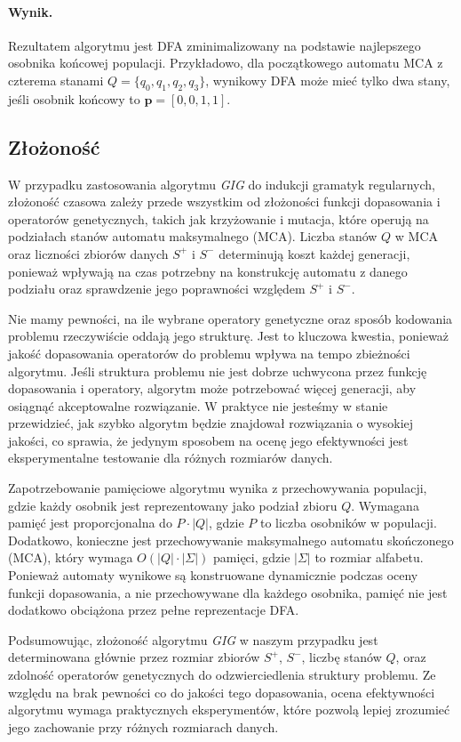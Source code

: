 \paragraph*{Wynik.}  
Rezultatem algorytmu jest DFA zminimalizowany na podstawie najlepszego osobnika końcowej populacji. Przykładowo, dla początkowego automatu MCA z czterema stanami \( Q = \{q_0, q_1, q_2, q_3\} \), wynikowy DFA może mieć tylko dwa stany, jeśli osobnik końcowy to \( \mathbf{p} = [0, 0, 1, 1] \).

\subsection{Złożoność}

W przypadku zastosowania algorytmu \textit{GIG} do indukcji gramatyk regularnych, złożoność czasowa zależy przede wszystkim od złożoności funkcji dopasowania i operatorów genetycznych, takich jak krzyżowanie i mutacja, które operują na podziałach stanów automatu maksymalnego (MCA). Liczba stanów \( Q \) w MCA oraz liczności zbiorów danych \( S^+ \) i \( S^- \) determinują koszt każdej generacji, ponieważ wpływają na czas potrzebny na konstrukcję automatu z danego podziału oraz sprawdzenie jego poprawności względem \( S^+ \) i \( S^- \).

Nie mamy pewności, na ile wybrane operatory genetyczne oraz sposób kodowania problemu rzeczywiście oddają jego strukturę. Jest to kluczowa kwestia, ponieważ jakość dopasowania operatorów do problemu wpływa na tempo zbieżności algorytmu. Jeśli struktura problemu nie jest dobrze uchwycona przez funkcję dopasowania i operatory, algorytm może potrzebować więcej generacji, aby osiągnąć akceptowalne rozwiązanie. W praktyce nie jesteśmy w stanie przewidzieć, jak szybko algorytm będzie znajdował rozwiązania o wysokiej jakości, co sprawia, że jedynym sposobem na ocenę jego efektywności jest eksperymentalne testowanie dla różnych rozmiarów danych.

Zapotrzebowanie pamięciowe algorytmu wynika z przechowywania populacji, gdzie każdy osobnik jest reprezentowany jako podział zbioru \( Q \). Wymagana pamięć jest proporcjonalna do \( P \cdot |Q| \), gdzie \( P \) to liczba osobników w populacji. Dodatkowo, konieczne jest przechowywanie maksymalnego automatu skończonego (MCA), który wymaga \( O(|Q| \cdot |\Sigma|) \) pamięci, gdzie \( |\Sigma| \) to rozmiar alfabetu. Ponieważ automaty wynikowe są konstruowane dynamicznie podczas oceny funkcji dopasowania, a nie przechowywane dla każdego osobnika, pamięć nie jest dodatkowo obciążona przez pełne reprezentacje DFA.

Podsumowując, złożoność algorytmu \textit{GIG} w naszym przypadku jest determinowana głównie przez rozmiar zbiorów \( S^+ \), \( S^- \), liczbę stanów \( Q \), oraz zdolność operatorów genetycznych do odzwierciedlenia struktury problemu. Ze względu na brak pewności co do jakości tego dopasowania, ocena efektywności algorytmu wymaga praktycznych eksperymentów, które pozwolą lepiej zrozumieć jego zachowanie przy różnych rozmiarach danych.
